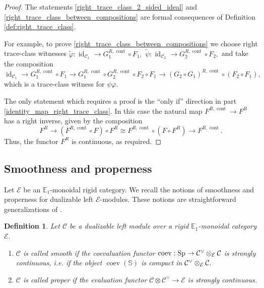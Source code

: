 \documentclass[11pt,leqno]{amsart}
\newtheorem{defi}[theo]{Definition}
\numberwithin{equation}{section}
\def\bS{\mathbb{S}}
\def\wt{\widetilde}
\newcommand{\tens}[1]{%
  \mathbin{\mathop{\otimes}\displaylimits_{#1}}%
}
\newcommand{\cont}{\operatorname{cont}}
\newcommand{\bE}{{\mathbb E}}
\newcommand{\cC}{{\mathcal C}}
\newcommand{\cE}{{\mathcal E}}
\newcommand{\Sp}{\operatorname{Sp}}
\newcommand{\id}{\operatorname{id}}
\newcommand{\coev}{\operatorname{coev}}
\begin{document}
\begin{proof}The statements \ref{right_trace_class_2_sided_ideal} and \ref{right_trace_class_between_compositions} are  formal consequences of Definition \ref{def:right_trace_class}. 
	
For example, to prove \ref{right_trace_class_between_compositions} we choose right trace-class witnesses $\wt{\varphi}:\id_{\cC_1}\to G_1^{R,\cont}\circ F_1,$ $\wt{\psi}:\id_{\cC_2}\to G_2^{R,\cont}\circ F_2,$ and take the composition
\begin{equation*}
\id_{\cC_1}\to G_1^{R,\cont}\circ F_1\to G_1^{R,\cont}\circ G_2^{R,\cont}\circ F_2\circ F_1\to (G_2\circ G_1)^{R,\cont} \circ (F_2\circ F_1),
\end{equation*} 
which is a trace-class witness for $\psi\varphi.$

The only statement which requires a proof is the ``only if'' direction in part \ref{identity_map_right_trace_class}. In this case the natural map $F^{R,\cont}\to F^R$ has a right inverse, given by the composition
\begin{equation*}
F^R\to (F^{R,\cont}\circ F)\circ F^R\cong F^{R,\cont}\circ (F\circ F^R)\to F^{R,\cont}.	
\end{equation*}
Thus, the functor $F^R$ is continuous, as required.\end{proof}

\subsection{Smoothness and properness}

Let $\cE$ be an $\bE_1$-monoidal rigid category. We recall the notions of smoothness and properness for dualizable left $\cE$-modules. These notions are straightforward generalizations of \cite[Definitions 8.2 and 8.8]{KonSob09}.

\begin{defi}
	Let $\cC$ be a dualizable left module over a rigid $\bE_1$-monoidal category $\cE.$
	\begin{enumerate}[label=(\roman*),ref=(\roman*)]
		\item $\cC$ is called smooth if the coevaluation functor $\coev:\Sp\to \cC^{\vee}\tens{\cE}\cC$ is strongly continuous, i.e. if the object $\coev(\bS)$ is compact in $\cC^{\vee}\tens{\cE}\cC.$ 
		\item $\cC$ is called proper if the evaluation functor $\cC\otimes\cC^{\vee}\to\cE$ is strongly continuous.     
	\end{enumerate}
\end{defi}
\end{document}
